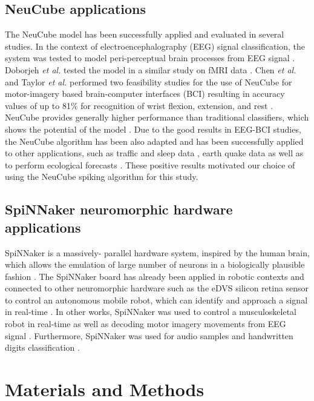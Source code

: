 \documentclass[journal,article,submit,moreauthors,pdftex,10pt,a4paper]{Definitions/mdpi}
\begin{document}
\subsection{NeuCube applications}
The NeuCube model has been successfully applied and evaluated in several studies. In the context of electroencephalography (EEG) signal classification, the system was tested to model peri-perceptual brain processes from EEG signal \cite{19}. Doborjeh \textit{et al.} tested the model in a similar study on fMRI data \cite{20}. Chen \textit{et al.} and Taylor \textit{et al.} performed two feasibility studies for the use of NeuCube for motor-imagery based brain-computer interfaces (BCI) resulting in accuracy values of up to 81\% for recognition of wrist flexion, extension, and rest \cite{21,22}. NeuCube provides generally higher performance than traditional classifiers, which shows the potential of the model \cite{9}. 
Due to the good results in EEG-BCI studies, the NeuCube algorithm has been also adapted and has been successfully applied to other applications, such as traffic and sleep data \cite{23}, earth quake data \cite{24} as well as to perform ecological forecasts \cite{25}.
These positive results motivated our choice of using the NeuCube spiking algorithm for this study. 
%
\subsection{SpiNNaker neuromorphic hardware applications}
SpiNNaker is  a  massively- parallel  hardware system, inspired by the human  brain, which allows the emulation of large number of neurons  in  a biologically  plausible fashion \cite{7}.
The SpiNNaker board has already been applied in robotic contexts and connected to other neuromorphic hardware such as the eDVS silicon retina sensor to control an autonomous mobile robot, which can identify and approach a signal in real-time \cite{26}. In other works,  SpiNNaker was used to control a musculoskeletal robot in real-time \cite{27} as well as decoding motor imagery movements from EEG signal \cite{28}. Furthermore, SpiNNaker was used for audio samples \cite{29} and handwritten digits classification \cite{30}.
\section{Materials and Methods}
\end{document}
